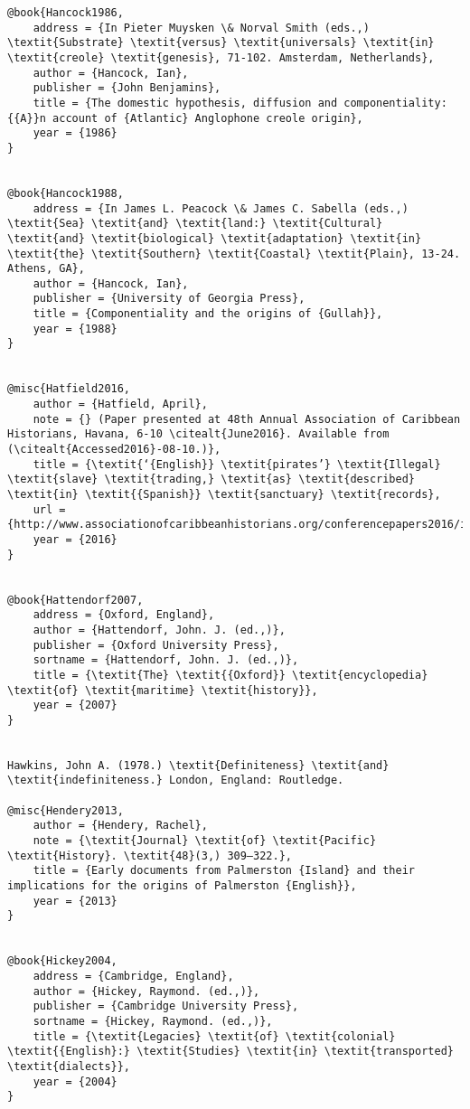 \begin{verbatim}
@book{Hancock1986,
	address = {In Pieter Muysken \& Norval Smith (eds.,) \textit{Substrate} \textit{versus} \textit{universals} \textit{in} \textit{creole} \textit{genesis}, 71-102. Amsterdam, Netherlands},
	author = {Hancock, Ian},
	publisher = {John Benjamins},
	title = {The domestic hypothesis, diffusion and componentiality: {{A}}n account of {Atlantic} Anglophone creole origin},
	year = {1986}
}


@book{Hancock1988,
	address = {In James L. Peacock \& James C. Sabella (eds.,) \textit{Sea} \textit{and} \textit{land:} \textit{Cultural} \textit{and} \textit{biological} \textit{adaptation} \textit{in} \textit{the} \textit{Southern} \textit{Coastal} \textit{Plain}, 13-24. Athens, GA},
	author = {Hancock, Ian},
	publisher = {University of Georgia Press},
	title = {Componentiality and the origins of {Gullah}},
	year = {1988}
}


@misc{Hatfield2016,
	author = {Hatfield, April},
	note = {} (Paper presented at 48th Annual Association of Caribbean Historians, Havana, 6-10 \citealt{June2016}. Available from  (\citealt{Accessed2016}-08-10.)},
	title = {\textit{‘{English}} \textit{pirates’} \textit{Illegal} \textit{slave} \textit{trading,} \textit{as} \textit{described} \textit{in} \textit{{Spanish}} \textit{sanctuary} \textit{records},
	url = {http://www.associationofcaribbeanhistorians.org/conferencepapers2016/index.htm)},
	year = {2016}
}


@book{Hattendorf2007,
	address = {Oxford, England},
	author = {Hattendorf, John. J. (ed.,)},
	publisher = {Oxford University Press},
	sortname = {Hattendorf, John. J. (ed.,)},
	title = {\textit{The} \textit{{Oxford}} \textit{encyclopedia} \textit{of} \textit{maritime} \textit{history}},
	year = {2007}
}


Hawkins, John A. (1978.) \textit{Definiteness} \textit{and} \textit{indefiniteness.} London, England: Routledge.

@misc{Hendery2013,
	author = {Hendery, Rachel},
	note = {\textit{Journal} \textit{of} \textit{Pacific} \textit{History}. \textit{48}(3,) 309–322.},
	title = {Early documents from Palmerston {Island} and their implications for the origins of Palmerston {English}},
	year = {2013}
}


@book{Hickey2004,
	address = {Cambridge, England},
	author = {Hickey, Raymond. (ed.,)},
	publisher = {Cambridge University Press},
	sortname = {Hickey, Raymond. (ed.,)},
	title = {\textit{Legacies} \textit{of} \textit{colonial} \textit{{English}:} \textit{Studies} \textit{in} \textit{transported} \textit{dialects}},
	year = {2004}
}



\end{verbatim}
